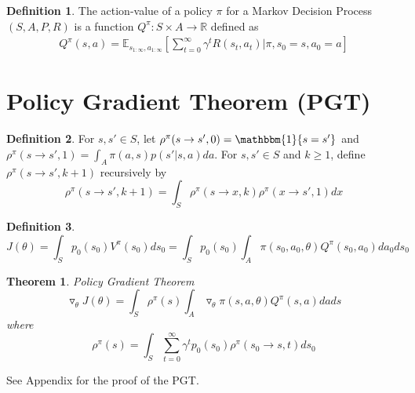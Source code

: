 \documentclass[11pt]{article}
\newtheorem{theorem}{Theorem}
\theoremstyle{definition}
\newtheorem{definition}{Definition}[section]
\begin{document}
\begin{definition}
The action-value of a policy $\pi$ for a Markov Decision Process $(S,A,P,R)$ is a function $Q^{\pi} : S \times A \rightarrow \mathbb{R}$ defined as
\begin{equation}
\begin{split}
Q^{\pi} (s,a) = \mathbb{E}_{s_{1:\infty},a_{1:\infty}} \left[ \sum_{t=0}^{\infty} \gamma^t R(s_t, a_t) | \pi, s_0 = s, a_0 = a \right]
\end{split}
\end{equation}
\end{definition}

\section{Policy Gradient Theorem (PGT)}
\begin{definition} For $s,s' \in S$, let $\rho^{\pi}(s \rightarrow s',0) = \mathbbm{1}\{s=s'\}$ and $\rho^{\pi}(s \rightarrow s',1) = \int_A \pi (a, s) p(s'|s,a) da$. For $s,s' \in S$ and $k \ge 1$, define $\rho^{\pi}(s \rightarrow s',k+1)$ recursively by
\begin{equation}
\rho^{\pi}(s \rightarrow s',k+1) = \int_S \rho^{\pi}(s \rightarrow x,k) \rho^{\pi}(x \rightarrow s',1) dx
\end{equation}
\end{definition}
\begin{definition}
\begin{equation}
J(\theta) = \int_S p_0(s_0)V^{\pi}(s_0)ds_0 = 
\int_S p_0(s_0) \int_A \pi (s_0, a_0, \theta ) Q^{\pi}(s_0,a_0) da_0 ds_0
\end{equation}
\end{definition}
\begin{theorem}
Policy Gradient Theorem
\begin{equation}
\triangledown_{\theta}J(\theta) = \int_S \rho^{\pi}(s) \int_A \triangledown_{\theta} \pi (s,a,\theta) Q^{\pi}(s,a) da ds
\end{equation}
where
\begin{equation}
\rho^{\pi}(s) = \int_S \sum_{t=0}^{\infty} \gamma^t p_0(s_0) \rho^{\pi}(s_0 \rightarrow s, t) ds_0
\end{equation}
\end{theorem}
See Appendix for the proof of the PGT.
\end{document}
